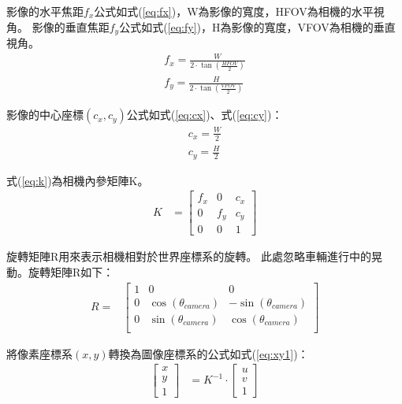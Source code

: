 \documentclass[12pt]{article}       %
\begin{document}
影像的水平焦距$f_{x}$公式如式(\ref{eq:fx})，W為影像的寬度，HFOV為相機的水平視角。
影像的垂直焦距$f_{y}$公式如式(\ref{eq:fy})，H為影像的寬度，VFOV為相機的垂直視角。
\begin{align}
    f_{x}=\frac{W}{2\cdot\tan\left(\frac{HFOV}{2}\right)}
    \label{eq:fx}
    \\
    f_{y}=\frac{H}{2\cdot\tan\left(\frac{VFOV}{2}\right)}
    \label{eq:fy}
\end{align}

影像的中心座標$(c_x,c_y)$公式如式(\ref{eq:cx})、式(\ref{eq:cy})：
\begin{align}
    c_{x}=\frac{W}{2}
    \label{eq:cx}
    \\
    c_{y}=\frac{H}{2}
    \label{eq:cy}
\end{align}

式(\ref{eq:k})為相機內參矩陣K。
\begin{align}
    K &=
    \begin{bmatrix}
        f_{x}       & 0             & c_{x}     \\
        0           & f_{y}         & c_{y}     \\
        0           & 0             & 1
    \end{bmatrix} 
    \label{eq:k}
\end{align}

旋轉矩陣R用來表示相機相對於世界座標系的旋轉。
此處忽略車輛進行中的晃動。旋轉矩陣R如下：
\begin{align}
    R=&
    \begin{bmatrix}
        1   & 0  & 0 \\
        0   & \cos(\theta_{camera})   & -\sin(\theta_{camera}) \\
        0   & \sin(\theta_{camera})   & \cos(\theta_{camera}) \\
    \end{bmatrix} 
    \label{eq:R2}
\end{align}

將像素座標系$(x,y)$轉換為圖像座標系的公式如式(\ref{eq:xy1})：
\begin{align}
    \begin{bmatrix}
        x       \\
        y    \\
        1        
    \end{bmatrix} 
     &=K^{-1}\cdot
     \begin{bmatrix}
        u       \\
        v       \\
        1        
    \end{bmatrix} 
    \label{eq:xy1}
\end{align}
\end{document}
